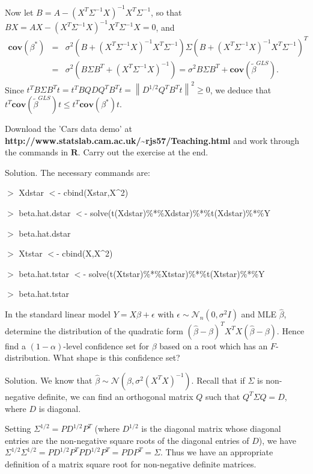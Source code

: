 Now let $B=A-(X^T\Sigma^{-1}X)^{-1}X^T\Sigma^{-1}$, so that $BX=AX - (X^T\Sigma^{-1}X)^{-1}X^T\Sigma^{-1}X=0$, and
\begin{eqnarray}
\mathbf{cov}(\beta^*) & = & \sigma^2\left(B+(X^T\Sigma^{-1}X)^{-1}X^T\Sigma^{-1}\right)\Sigma \left(B+(X^T\Sigma^{-1}X)^{-1}X^T\Sigma^{-1}\right)^T  \nonumber\\
& = & \sigma^2\left(B\Sigma B^T +(X^T\Sigma^{-1}X)^{-1}\right) = \sigma^2 B\Sigma B^T + \mathbf{cov}(\tilde{\beta}^{GLS}).
\end{eqnarray}
Since $t^TB\Sigma B^Tt = t^TBQDQ^TB^Tt  = \left\|D^{1/2}Q^TB^Tt\right\|^2\geq 0$, we deduce that $t^T\mathbf{cov}(\tilde{\beta}^{GLS})t\leq t^T\mathbf{cov}(\beta^*)t$.





\item Download the 'Cars data demo' at {\bf http://www.statslab.cam.ac.uk/\~{}rjs57/Teaching.html} and work through the commands in $\mathbf{R}$. Carry out the exercise at the end.



Solution. The necessary commands are:

$>$ Xdstar $<$- cbind(Xstar,X\^{}2)

$>$ beta.hat.dstar $<$- solve(t(Xdstar)\%*\%Xdstar)\%*\%t(Xdstar)\%*\%Y

$>$ beta.hat.dstar

$>$ Xtstar $<$- cbind(X,X\^{}2)

$>$ beta.hat.tstar $<$- solve(t(Xtstar)\%*\%Xtstar)\%*\%t(Xtstar)\%*\%Y

$>$ beta.hat.tstar





\item In the standard linear model $Y=X\beta+\epsilon$ with $\epsilon\sim\mathcal{N}_n(0,\sigma^2I)$ and MLE $\hat{\beta}$, determine the distribution of the quadratic form $\left(\hat{\beta}-\beta\right)^TX^TX\left(\hat{\beta}-\beta\right)$. Hence find a $(1-\alpha)$-level confidence set for $\beta$ based on a root which has an $F$-distribution. What shape is this confidence set?



Solution. We know that $\hat{\beta}\sim \mathcal{N}(\beta,\sigma^2(X^TX)^{-1})$. Recall that if $\Sigma$ is non-negative definite, we can find an orthogonal matrix $Q$ such that $Q^T\Sigma Q=D$, where $D$ is diagonal.

Setting $\Sigma^{1/2}=PD^{1/2}P^T$ (where $D^{1/2}$ is the diagonal matrix whose diagonal entries are the non-negative square roots of the diagonal entries of $D$), we have $\Sigma^{1/2}\Sigma^{1/2}=PD^{1/2}P^TPD^{1/2}P^T=PDP^T=\Sigma$. Thus we have an appropriate definition of a matrix square root for non-negative definite matrices.

